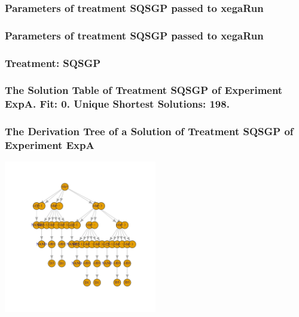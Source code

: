 \documentclass[18pt,c]{beamer}
\begin{document}

 \begin{frame}
 \fontsize{8pt}{9pt}\selectfont
 \frametitle{  Parameters of treatment SQSGP passed to xegaRun
 }

 \label{ExpAtParmTable018.tex}  
 \end{frame}


 \begin{frame}
 \fontsize{8pt}{9pt}\selectfont
 \frametitle{  Parameters of treatment SQSGP passed to xegaRun
 }

 \label{ExpAtParmTable019.tex}  
 \end{frame}

 \begin{frame}
 \fontsize{8pt}{9pt}\selectfont
 \frametitle{ Treatment: SQSGP }

 \label{ExpAStatsTable019.tex}  
 \end{frame}

 \begin{frame}
 \fontsize{8pt}{9pt}\selectfont
 \frametitle{ The Solution Table of Treatment SQSGP of Experiment ExpA. Fit: 0. Unique Shortest Solutions: 198. }

 \label{ExpASolutionTable004.tex}  
 \end{frame}

 \begin{frame}
 \frametitle{ The Derivation Tree of a Solution of Treatment SQSGP of Experiment ExpA }
 \begin{center}
\includegraphics[width=0.5\textwidth, angle=0]
{ExpADerivationTreeFigure001.pdf}
 \end{center}
 \label{report/ExpADerivationTreeFigure001.pdf}  
 \end{frame}
\end{document}
